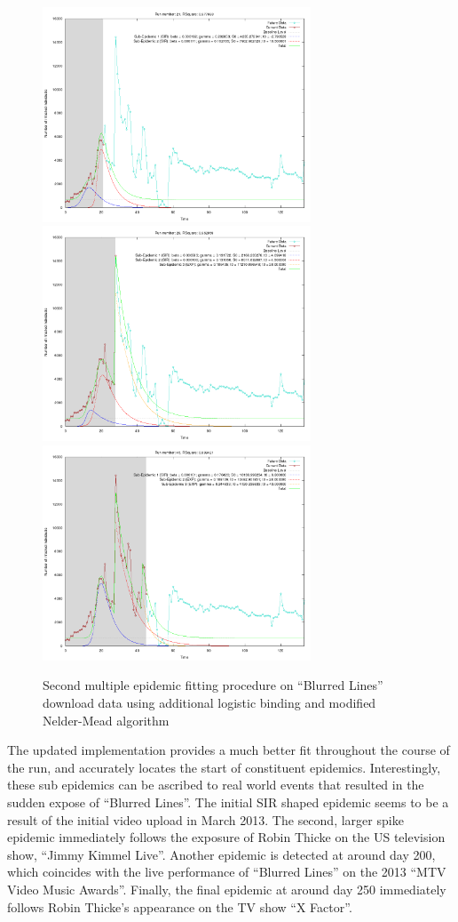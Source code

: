 \begin{centering}
\begin{figure}[h!]
  \includegraphics[width=8cm]{images/multi/goodrt1.png}
  \includegraphics[width=8cm]{images/multi/goodrt2.png}
  \includegraphics[width=8cm]{images/multi/goodrt3.png}
  \caption{Second multiple epidemic fitting procedure on ``Blurred
    Lines'' download data using additional logistic binding and
    modified Nelder-Mead algorithm }
\label{fig:goodrt}
  \end{figure}
\end{centering}

The updated implementation provides a much better fit throughout the
course of the run, and accurately locates the start of constituent
epidemics. Interestingly, these sub epidemics can be ascribed to real
world events that resulted in the sudden expose of ``Blurred
Lines''. The initial SIR shaped epidemic seems to be a result of the
initial video upload in March 2013. The second, larger spike epidemic
immediately follows the exposure of Robin Thicke on the US television
show, ``Jimmy Kimmel Live''. Another epidemic is detected at around
day 200, which coincides with the live performance of ``Blurred
Lines'' on the 2013 ``MTV Video Music Awards''. Finally, the final
epidemic at around day 250 immediately follows Robin Thicke's appearance on the TV show ``X Factor''.  



